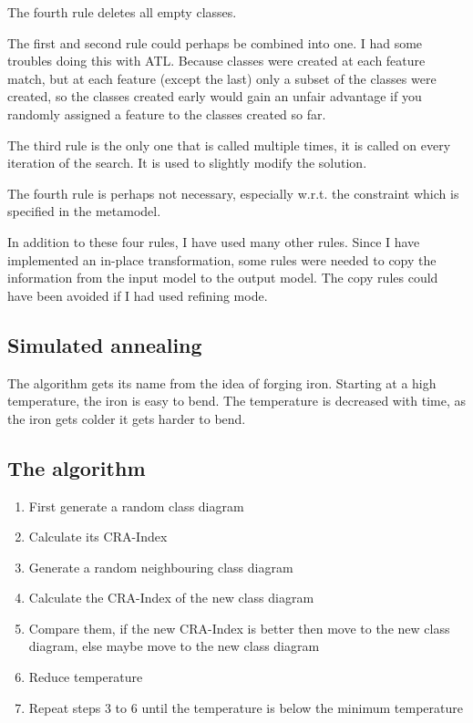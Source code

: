 \documentclass[a4paper]{article}
\begin{document}
The fourth rule deletes all empty classes.

The first and second rule could perhaps be combined into one.
I had some troubles doing this with ATL.
Because classes were created at each feature match, but at each feature (except the last) only a subset of the classes were created, so the classes created early would gain an unfair advantage if you randomly assigned a feature to the classes created so far.

The third rule is the only one that is called multiple times, it is called on every iteration of the search.
It is used to slightly modify the solution.

The fourth rule is perhaps not necessary, especially w.r.t. the constraint which is specified in the metamodel.

In addition to these four rules, I have used many other rules.
Since I have implemented an in-place transformation, some rules were needed to copy the information from the input model to the output model.
The copy rules could have been avoided if I had used refining mode.

\subsection{Simulated annealing}

The algorithm gets its name from the idea of forging iron.
Starting at a high temperature, the iron is easy to bend.
The temperature is decreased with time, as the iron gets colder it gets harder to bend.


\subsection{The algorithm}

\begin{enumerate}
  \item First generate a random class diagram
  \item Calculate its CRA-Index
  \item Generate a random neighbouring class diagram
  \item Calculate the CRA-Index of the new class diagram
  \item Compare them, if the new CRA-Index is better then move to the new
class diagram, else maybe move to the new class diagram
  \item Reduce temperature
  \item Repeat steps 3 to 6 until the temperature is below the minimum
temperature
\end{enumerate}
\end{document}

